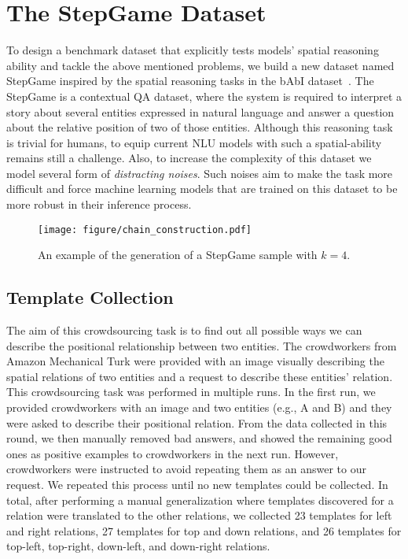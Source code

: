 \documentclass[letterpaper]{article} \usepackage{aaai22}  \usepackage{times}  \usepackage{helvet}  \usepackage{courier}  \usepackage[hyphens]{url}  \usepackage{graphicx} \urlstyle{rm} \def\UrlFont{\rm}  \usepackage{natbib}  \usepackage{caption} \DeclareCaptionStyle{ruled}{labelfont=normalfont,labelsep=colon,strut=off} \frenchspacing  \setlength{\pdfpagewidth}{8.5in}  \setlength{\pdfpageheight}{11in}  \usepackage{algorithm}
\begin{document}
\section{The StepGame Dataset}
To design a benchmark dataset that explicitly tests models' spatial reasoning ability and tackle the above mentioned problems, we build a new dataset named StepGame inspired by the spatial reasoning tasks in the bAbI dataset~\cite{weston2015towards}. The StepGame is a contextual QA dataset, where the system is required to interpret a story about several entities expressed in natural language and answer a question about the relative position of two of those entities. Although this reasoning task is trivial for humans, to equip current NLU models with such a spatial-ability remains still a challenge. 
Also, to increase the complexity of this dataset we model several form of \textit{distracting noises}. Such noises aim to make the task more difficult and force machine learning models that are trained on this dataset to be more robust in their inference process.  
\begin{figure}[!t]
  \centering
  \texttt{[image: figure/chain\_construction.pdf]}
  \caption{An example of the generation of a StepGame sample with $k=4$.}
  \label{generation_step}
\end{figure}

\subsection{Template Collection}

The aim of this crowdsourcing task is to find out all possible ways we can describe the positional relationship between two entities. 
The crowdworkers from Amazon Mechanical Turk were provided with an image visually describing the spatial relations of two entities and a request to describe these entities' relation. 
This crowdsourcing task was performed in multiple runs. 
In the first run, we provided crowdworkers with an image and two entities (e.g., A and B) and they were asked to describe their positional relation. 
From the data collected in this round, we then manually removed bad answers, and showed the remaining good ones as positive examples to crowdworkers in the next run. However, crowdworkers were instructed to avoid repeating them as an answer to our request. We repeated this process until no new templates could be collected. 
In total, after performing a manual generalization where templates discovered for a relation were translated to the other relations, we collected 23 templates for left and right relations, 27 templates for top and down relations, and 26 templates for top-left, top-right, down-left, and down-right relations. 
\end{document}
